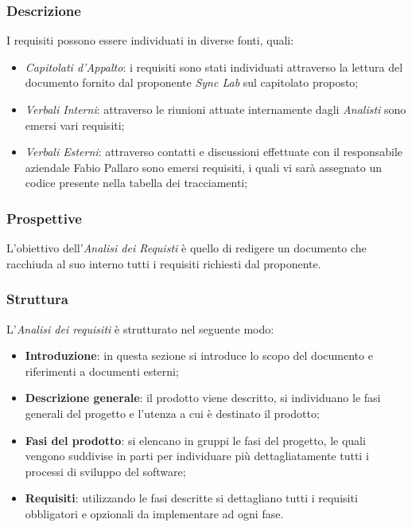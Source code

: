 \subsubsection{Descrizione}\label{2.2.3.3}
I requisiti possono essere individuati in diverse fonti, quali:
\begin{itemize}
	\item \textit{Capitolati d'Appalto}: i requisiti sono stati individuati attraverso la lettura del documento fornito dal proponente \textit{Sync Lab} sul capitolato proposto;
	\item \textit{Verbali Interni}: attraverso le riunioni attuate internamente dagli \textit{Analisti} sono emersi vari requisiti;
	\item \textit{Verbali Esterni}: attraverso contatti e discussioni effettuate con il responsabile aziendale Fabio Pallaro sono emersi requisiti, i quali vi sarà assegnato un codice presente nella tabella dei tracciamenti;
\end{itemize}
\subsubsection{Prospettive}\label{2.2.3.4}
L'obiettivo dell'\textit{Analisi dei Requisti} è quello di redigere un documento che racchiuda al suo interno tutti i requisiti richiesti dal proponente.
\subsubsection{Struttura}\label{2.2.3.5} %
L'\textit{Analisi dei requisiti} è strutturato nel seguente modo:
\begin{itemize}
	\item \textbf{Introduzione}: in questa sezione si introduce lo scopo del documento e riferimenti a documenti esterni;
	\item \textbf{Descrizione generale}: il prodotto viene descritto, si individuano le fasi generali del progetto e l'utenza a cui è destinato il prodotto;
	\item \textbf{Fasi del prodotto}: si elencano in gruppi le fasi del progetto, le quali vengono suddivise in parti per individuare più dettagliatamente tutti i processi di sviluppo del software;
	\item \textbf{Requisiti}: utilizzando le fasi descritte si dettagliano tutti i requisiti obbligatori e opzionali da implementare ad ogni fase.
\end{itemize}
